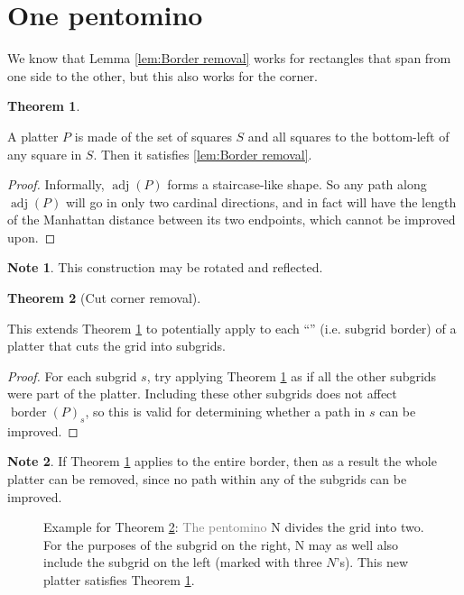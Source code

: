 \documentclass{article}
\theoremstyle{definition}%
\newtheorem{theorem}{Theorem}[section]
\newtheorem*{note}{Note}
\newcommand{\minordetail}[1]{\textcolor{gray}{#1}}
\newcommand{\badterm}[1]{\textcolor{red}{\uwave{\textcolor{black}{#1}}}}
\newcommand{\adj}{\operatorname{adj}}
\newcommand{\border}{\operatorname{border}}
\begin{document}
\section{One pentomino}

We know that Lemma \ref{lem:Border removal} works for rectangles that span from one side to the other, but this also works for the corner.

\begin{theorem}
\label{th:Corner removal}

A platter $P$ is made of the set of squares $S$ and all squares to the bottom-left of any square in $S$. Then it satisfies \ref{lem:Border removal}.
\end{theorem}

\begin{proof}
Informally, $\adj(P)$ forms a staircase-like shape. So any path along $\adj(P)$ will go in only two cardinal directions, and in fact will have the length of the Manhattan distance between its two endpoints, which cannot be improved upon.
\end{proof}

\begin{note}
This construction may be rotated and reflected.
\end{note}

\begin{theorem}[Cut corner removal]
\label{th:Cut corner removal}

This extends Theorem \ref{th:Corner removal} to potentially apply to each ``\badterm{side}'' (i.e. subgrid border) of a platter that cuts the grid into subgrids.
\end{theorem}

\begin{proof}
For each subgrid $s$, try applying Theorem \ref{th:Corner removal} as if all the other subgrids were part of the platter. Including these other subgrids does not affect $\border(P)_s$, so this is valid for determining whether a path in $s$ can be improved.
\end{proof}

\begin{note}
If Theorem \ref{th:Corner removal} applies to the entire border, then as a result the whole platter can be removed, since no path within any of the subgrids can be improved.
\end{note}

\begin{figure}[htbp]
    \centering
    \caption{Example for Theorem \ref{th:Cut corner removal}: \minordetail{The pentomino} N divides the grid into two. For the purposes of the subgrid on the right, N may as well also include the subgrid on the left (marked with three $N$'s). This new platter satisfies Theorem \ref{th:Corner removal}.}
\end{figure}
\end{document}
